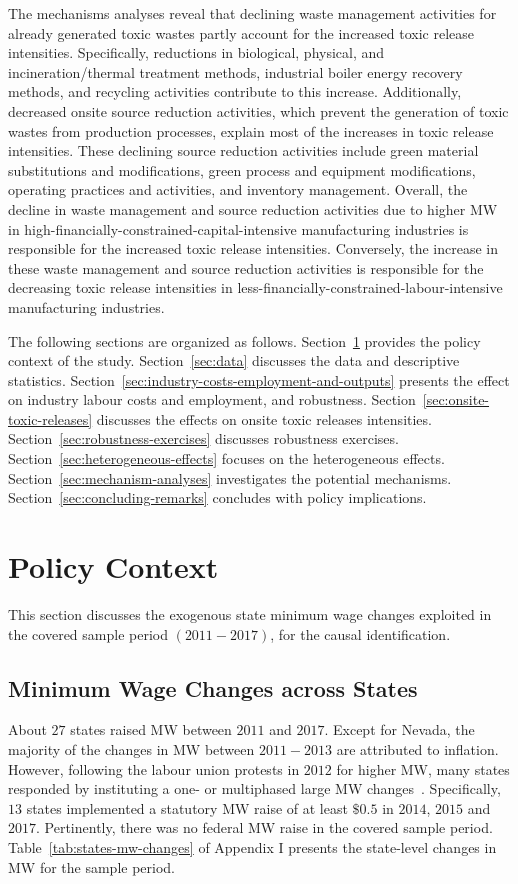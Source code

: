 \documentclass[12pt, english]{article}
\begin{document}
    The mechanisms analyses reveal that declining waste management activities for already generated toxic wastes partly account for the increased toxic release intensities. Specifically, reductions in biological, physical, and incineration/thermal treatment methods, industrial boiler energy recovery methods, and recycling activities contribute to this increase. Additionally, decreased onsite source reduction activities, which prevent the generation of toxic wastes from production processes, explain most of the increases in toxic release intensities. These declining source reduction activities include green material substitutions and modifications, green process and equipment modifications, operating practices and activities, and inventory management. Overall, the decline in waste management and source reduction activities due to higher MW in high-financially-constrained-capital-intensive manufacturing industries is responsible for the increased toxic release intensities. Conversely, the increase in these waste management and source reduction activities is responsible for the decreasing toxic release intensities in less-financially-constrained-labour-intensive manufacturing industries.

    The following sections are organized as follows. Section~\ref{sec:policy-context} provides the policy context of the study. Section~\ref{sec:data} discusses the data and descriptive statistics. Section~\ref{sec:industry-costs-employment-and-outputs} presents the effect on industry labour costs and employment, and robustness. Section~\ref{sec:onsite-toxic-releases} discusses the effects on onsite toxic releases intensities. Section~\ref{sec:robustness-exercises} discusses robustness exercises. Section~\ref{sec:heterogeneous-effects} focuses on the heterogeneous effects. Section~\ref{sec:mechanism-analyses} investigates the potential mechanisms. Section~\ref{sec:concluding-remarks} concludes with policy implications.


    \section{Policy Context}\label{sec:policy-context}
    This section discusses the exogenous state minimum wage changes exploited in the covered sample period $(2011-2017)$, for the causal identification.

    \subsection{Minimum Wage Changes across States}\label{subsec:minimum-wage-changes-across-states}
    About $27$ states raised MW between $2011$ and $2017$. Except for Nevada, the majority of the changes in MW between $2011-2013$ are attributed to inflation. However, following the labour union protests in $2012$ for higher MW, many states responded by instituting a one- or multiphased large MW changes~\parencite{lathrop2021raises}. Specifically, $13$ states implemented a statutory MW raise of at least $\$0.5$ in $2014$, $2015$ and $2017$. Pertinently, there was no federal MW raise in the covered sample period. Table~\ref{tab:states-mw-changes} of Appendix I presents the state-level changes in MW for the sample period.
\end{document}
